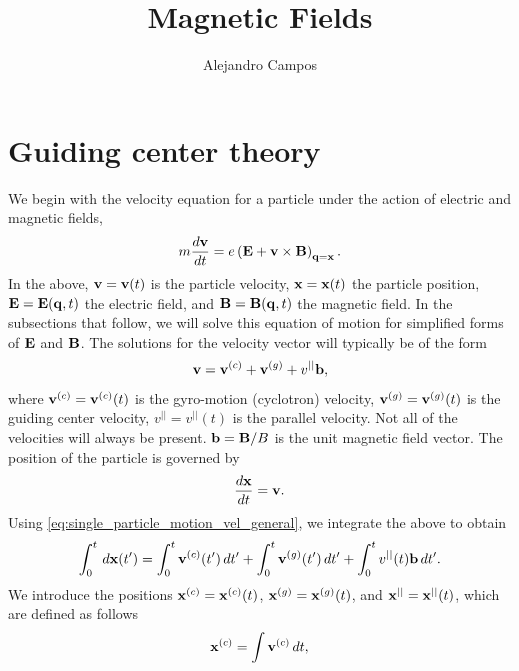 \documentclass[a4paper,11pt]{report}
\title{Magnetic Fields}
\author{Alejandro Campos}
\begin{document}
\maketitle
\tableofcontents

\chapter{Guiding center theory}
We begin with the velocity equation for a particle under the action of electric and magnetic fields, 
\begin{equation}
\label{eq:single_particle_motion}
    m \frac{d \mathbf{v}}{dt} = e \left ( \mathbf{E} + \mathbf{v} \times \mathbf{B} \right )_{\mathbf{q} = \mathbf{x}}.
\end{equation}
In the above, $\mathbf{v} = \mathbf{v}(t)$ is the particle velocity, $\mathbf{x} = \mathbf{x}(t)$ the particle position, $\mathbf{E} = \mathbf{E}(\mathbf{q},t)$ the electric field, and $\mathbf{B} = \mathbf{B}(\mathbf{q},t)$ the magnetic field. In the subsections that follow, we will solve this equation of motion for simplified forms of $\mathbf{E}$ and $\mathbf{B}$. The solutions for the velocity vector will typically be of the form
\begin{equation}
    \label{eq:single_particle_motion_vel_general}
    \mathbf{v} = \mathbf{v}^{(c)} + \mathbf{v}^{(g)} + v^{||} \mathbf{b},
\end{equation}
where $\mathbf{v}^{(c)} = \mathbf{v}^{(c)}(t)$ is the gyro-motion (cyclotron) velocity, $\mathbf{v}^{(g)} = \mathbf{v}^{(g)}(t)$ is the guiding center velocity, $v^{||} = v^{||}(t)$ is the parallel velocity. Not all of the velocities will always be present. $\mathbf{b} = \mathbf{B} / B$ is the unit magnetic field vector. The position of the particle is governed by 
\begin{equation}
    \frac{d\mathbf{x}}{dt} = \mathbf{v}.
\end{equation}
Using \cref{eq:single_particle_motion_vel_general}, we integrate the above to obtain
\begin{equation}
    \label{eq:single_particle_motion_pos_eq_mod}
    \int_0^t \, d\mathbf{x}(t') = \int_0^t \mathbf{v}^{(c)}(t') \, dt' + \int_0^t \mathbf{v}^{(g)}(t') \, dt' + \int_0^t v^{||}(t) \mathbf{b} \, dt'.
\end{equation}
We introduce the positions $\mathbf{x}^{(c)} = \mathbf{x}^{(c)}(t)$, $\mathbf{x}^{(g)} = \mathbf{x}^{(g)}(t)$, and $\mathbf{x}^{||} = \mathbf{x}^{||}(t)$, which are defined as follows
\begin{equation}
    \mathbf{x}^{(c)} = \int \mathbf{v}^{(c)} \, dt,
\end{equation}
\end{document}
